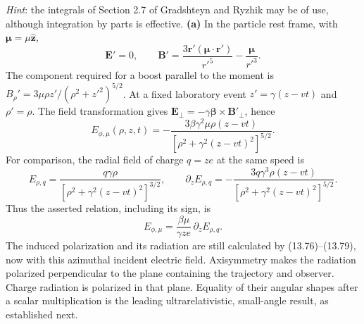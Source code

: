 \emph{Hint}: the integrals of Section 2.7 of Gradshteyn and Ryzhik may be of use, although integration by parts is effective.
\solution
\textbf{(a)} In the particle rest frame, with
$\boldsymbol\mu=\mu\hat{\mathbf z}$,
\[
 \mathbf E'=0,\qquad
 \mathbf B'=\frac{3\mathbf r'(\boldsymbol\mu\cdot\mathbf r')}
                   {r'^5}-\frac{\boldsymbol\mu}{r'^3}.
\]
The component required for a boost parallel to the moment is
$B_\rho'=3\mu\rho z'/(\rho^2+z'^2)^{5/2}$.
At a fixed laboratory event $z'=\gamma(z-vt)$ and
$\rho'=\rho$. The field transformation gives
$\mathbf E_\perp=-\gamma\boldsymbol\beta\times\mathbf B'_\perp$,
hence
\[
 E_{\phi,\mu}(\rho,z,t)
 =-\frac{3\beta\gamma^2\mu\rho(z-vt)}
 {[\rho^2+\gamma^2(z-vt)^2]^{5/2}}.
\]
For comparison, the radial field of charge $q=ze$ at the same speed is
\[
 E_{\rho,q}=\frac{q\gamma\rho}
 {[\rho^2+\gamma^2(z-vt)^2]^{3/2}},
 \qquad
 \partial_zE_{\rho,q}
 =-\frac{3q\gamma^3\rho(z-vt)}
 {[\rho^2+\gamma^2(z-vt)^2]^{5/2}}.
\]
Thus the asserted relation, including its sign, is
\[
 \boxed{E_{\phi,\mu}
 =\frac{\beta\mu}{\gamma ze}\,\partial_z E_{\rho,q}.}
\]
The induced polarization and its radiation are still calculated by
(13.76)--(13.79), now with this azimuthal incident electric field.
Axisymmetry makes the radiation polarized perpendicular to the plane
containing the trajectory and observer. Charge radiation is polarized
in that plane. Equality of their angular shapes after a scalar
multiplication is the leading ultrarelativistic, small-angle result,
as established next.

